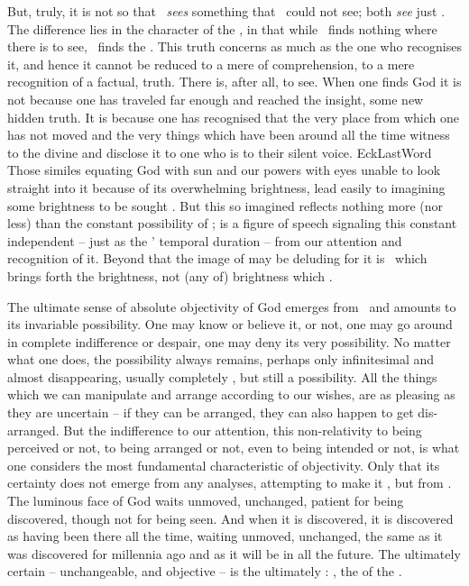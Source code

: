 \pa
But, truly, it is not so that \Yes\ {\em sees} something that \No\ could not see;
both {\em see} just . The difference lies in the character of the
, in that while \No\ finds nothing where there is 
to see, \Yes\ finds the . This truth concerns  as much
as the one who recognises it, and hence it cannot be reduced to a mere 
of comprehension, to a mere recognition of a factual,  truth.
There is, after all,  to see.  When one finds God it is not because
one has traveled far enough and reached the insight, some new hidden truth. It
is because one has recognised that the very place from which one has not moved
and the very things which have been around all the time witness to the divine
 and disclose it to one who is  to their silent voice.
%
\citet{Some people make believe to find God as a light or savour; they may find
  a light or a savour but that is not to find God. According to one scripture,
  God shines in the dark where every now and then we may catch a glimpse of him.
  Where to us God shows least he is often most.}{EckLastWord}{} Those similes
equating God with sun and our powers with eyes unable to look straight into it
because of its overwhelming brightness, lead easily to imagining some
 brightness to be sought .  But this so imagined
 reflects nothing more (nor less) than the constant
possibility of \Yes;  is a figure of speech signaling this
constant  independent -- just as the ' temporal
duration -- from our attention and recognition of it.  Beyond that the image of
 may be deluding for it is \Yes\ which brings forth the
brightness, not (any  of) brightness which  \Yes.

The ultimate sense of absolute {objectivity} of God emerges from \Yes\ and
amounts to its invariable possibility. One may know or believe it, or not, one
may go around in complete indifference or despair, one may deny its very
possibility. No matter what one does, the possibility always remains, perhaps
only infinitesimal and almost disappearing, usually completely ,
but still a possibility.  All the things which we can manipulate and arrange
according to our wishes, are as pleasing as they are uncertain -- if they can be
arranged, they can also happen to get dis-arranged.  But the indifference to our
attention, this non-relativity to being perceived or not, to being arranged or
not, even to being intended or not, is what one considers the most fundamental
characteristic of {objectivity}. Only that its certainty does not emerge from
any analyses, attempting to make it , but from .
The luminous face of God waits unmoved, unchanged, patient for being discovered,
though not for being seen. And when it is discovered, it is discovered as having
been there all the time, waiting unmoved, unchanged, the same as it was
discovered for millennia ago and as it will be in all the future. The ultimately
certain -- unchangeable,  and objective -- is the ultimately
: , the  of the .

